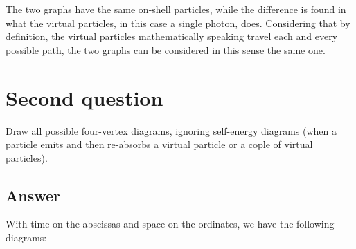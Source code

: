 \vspace{1em}

The two graphs have the same on-shell particles, while the difference is found in what the virtual particles, in this case a single photon, does. Considering that by definition, the virtual particles mathematically speaking travel each and every possible path, the two graphs can be considered in this sense the same one.

\newpage

\section{Second question}
Draw all possible four-vertex diagrams, ignoring self-energy diagrams (when a particle emits and then re-absorbs a virtual particle or a cople of virtual particles).

\subsection{Answer}
With time on the abscissas and space on the ordinates, we have the following diagrams:

